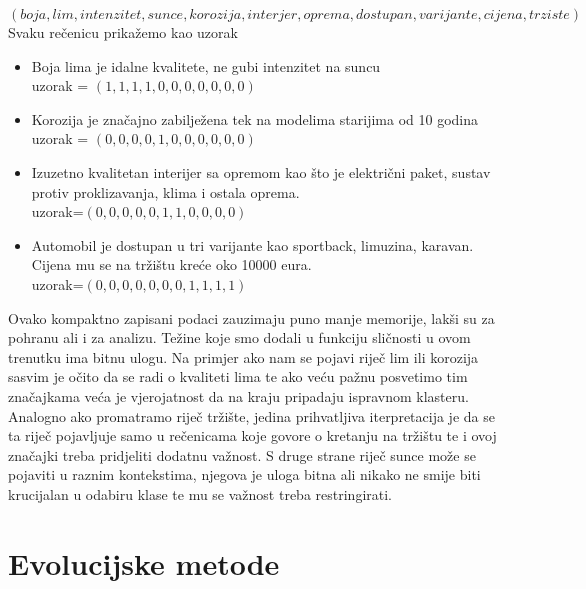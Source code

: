 \documentclass[a4paper,twoside,12pt]{memoir} %
\begin{document}
\[ (boja, lim, intenzitet, sunce, korozija, interjer, oprema, dostupan, varijante, cijena, trziste) \]
Svaku rečenicu prikažemo kao uzorak
\begin{itemize}
\item Boja lima je idalne kvalitete, ne gubi intenzitet na suncu\\uzorak = $(1,1,1,1,0,0,0,0,0,0,0)$
\item Korozija je značajno zabilježena tek na modelima starijima od 10 godina\\
uzorak = $(0,0,0,0,1,0,0,0,0,0,0)$
\item Izuzetno kvalitetan interijer sa opremom kao što je električni paket, sustav protiv proklizavanja, klima i ostala oprema.\\
uzorak=$(0,0,0,0,0,1,1,0,0,0,0)$
\item  Automobil je dostupan u tri varijante kao sportback, limuzina, karavan. Cijena mu se na tržištu kreće oko 10000 eura.\\
uzorak=$(0,0,0,0,0,0,0,1,1,1,1)$
\end{itemize}
Ovako kompaktno zapisani podaci zauzimaju puno manje memorije, lakši su za pohranu ali i za analizu. Težine koje smo dodali u funkciju sličnosti u ovom trenutku ima bitnu ulogu. Na primjer ako nam se pojavi riječ lim ili korozija sasvim je očito da se radi o kvaliteti lima te ako veću pažnu posvetimo tim značajkama veća je vjerojatnost da na kraju pripadaju ispravnom klasteru. Analogno ako promatramo riječ tržište, jedina prihvatljiva iterpretacija je da se ta riječ pojavljuje samo u rečenicama koje govore o kretanju na tržištu te i ovoj značajki treba pridjeliti dodatnu važnost. S druge strane riječ sunce može se pojaviti u raznim kontekstima, njegova je uloga bitna ali nikako ne smije biti krucijalan u odabiru klase te mu se važnost treba restringirati.
\chapter[Evolucijske metode]{Evolucijske metode}
\label{chp:heuristike}
\end{document}
